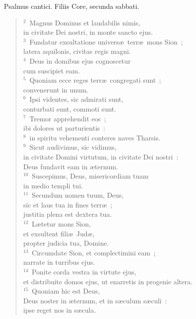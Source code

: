\bchapter
\lettrine[lines=3,image=true,loversize=0.05,lraise=-0.03]{P}{}salmus cantici. Filiis Core, secunda sabbati.
\begin{flushleft}\begin{verse}\vspace{6pt}${}^{2}$~Magnus Dominus et laudabilis nimis,\\ in civitate Dei nostri, in monte sancto ejus.\\
${}^{3}$~Fundatur exsultatione univers\ae\ terr\ae\ mons Sion~;\\ latera aquilonis, civitas regis magni.\\
${}^{4}$~Deus in domibus ejus cognoscetur\\ cum suscipiet eam.\\
${}^{5}$~Quoniam ecce reges terr\ae\ congregati sunt~;\\ convenerunt in unum.\\
${}^{6}$~Ipsi videntes, sic admirati sunt,\\ conturbati sunt, commoti sunt.\\
${}^{7}$~Tremor apprehendit eos~;\\ ibi dolores ut parturientis~:\\
${}^{8}$~in spiritu vehementi conteres naves Tharsis.\\
${}^{9}$~Sicut audivimus, sic vidimus,\\ in civitate Domini virtutum, in civitate Dei nostri~:\\ Deus fundavit eam in \ae ternum.\\
${}^{10}$~Suscepimus, Deus, misericordiam tuam\\ in medio templi tui.\\
${}^{11}$~Secundum nomen tuum, Deus,\\ sic et laus tua in fines terr\ae~;\\ justitia plena est dextera tua.\\
${}^{12}$~L\ae tetur mons Sion,\\ et exsultent fili\ae\ Jud\ae ,\\ propter judicia tua, Domine.\\
${}^{13}$~Circumdate Sion, et complectimini eam~;\\ narrate in turribus ejus.\\
${}^{14}$~Ponite corda vestra in virtute ejus,\\ et distribuite domos ejus, ut enarretis in progenie altera.\\
${}^{15}$~Quoniam hic est Deus,\\ Deus noster in \ae ternum, et in s\ae culum s\ae culi~:\\ ipse reget nos in s\ae cula.\end{verse}\end{flushleft}



